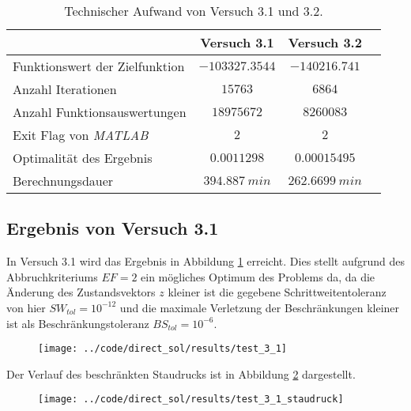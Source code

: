 \begin{table}[H]
    \centering
    \caption{Technischer Aufwand von Versuch 3.1 und 3.2.}\label{tab:Versuch3_TA}
    \begin{tabularx}{.9\textwidth}{Zccc}
        \toprule
         & \textbf{Versuch 3.1} & \textbf{Versuch 3.2} \\
        \midrule
        Funktionswert der Zielfunktion & $-103327.3544$ & $-140216.741$ \\
        Anzahl Iterationen & $15763$ & $6864$ \\
        Anzahl Funktionsauswertungen & $18975672$ & $8260083$ \\
        Exit Flag von \textit{MATLAB} & $2$ & $2$ \\
        Optimalität des Ergebnis & $0.0011298$ & $0.00015495$ \\
        Berechnungsdauer & $394.887 \ min$ & $262.6699 \ min$ \\
        \bottomrule
    \end{tabularx}
\end{table}





\subsection{Ergebnis von Versuch 3.1}\label{kap:Versuch31}
In Versuch 3.1 wird das Ergebnis in Abbildung \ref{img:test_3_1} erreicht. Dies stellt aufgrund des Abbruchkriteriums $EF = 2$ ein mögliches Optimum des Problems da, da die Änderung des Zustandsvektors $z$ kleiner ist die gegebene Schrittweitentoleranz von hier $SW_{tol} = 10^{-12}$ und die maximale Verletzung der Beschränkungen kleiner ist als Beschränkungstoleranz $BS_{tol} = 10^{-6}$.
\begin{figure}[H]
\begin{center}
\texttt{[image: ../code/direct\_sol/results/test\_3\_1]}
 \label{img:test_3_1}
\end{center}
\end{figure}
Der Verlauf des beschränkten Staudrucks ist in Abbildung \ref{img:test_3_1_staudruck} dargestellt.
\begin{figure}[H]
\begin{center}
\texttt{[image: ../code/direct\_sol/results/test\_3\_1\_staudruck]}
 \label{img:test_3_1_staudruck}
\end{center}
\end{figure}




